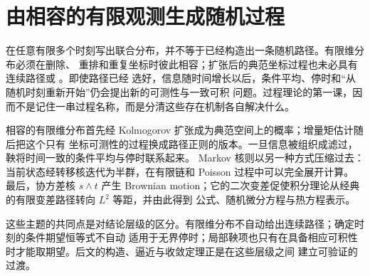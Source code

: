 \chapter{由相容的有限观测生成随机过程}\label{ch:06}

在任意有限多个时刻写出联合分布，并不等于已经构造出一条随机路径。有限维分布必须在删除、
重排和重复坐标时彼此相容；扩张后的典范坐标过程也未必具有连续路径或 \cadlagPath{}。即使路径已经
选好，信息随时间增长以后，条件平均、停时和“从随机时刻重新开始”仍会提出新的可测性与一致可积
问题。过程理论的第一课，因而不是记住一串过程名称，而是分清这些存在机制各自解决什么。

相容的有限维分布首先经 Kolmogorov 扩张成为典范空间上的概率；增量矩估计随后把这个只有
坐标可测性的过程换成路径正则的版本。一旦信息被组织成滤过，鞅将时间一致的条件平均与停时联系起来。
Markov 核则以另一种方式压缩过去：当前状态经转移核迭代为半群，在有限链和 Poisson 过程中可以完全展开计算。
最后，协方差核 $s\wedge t$ 产生 Brownian motion；它的二次变差促使积分理论从经典的有限变差路径转向
$L^2$ 等距，并由此得到 \Ito{} 公式、随机微分方程与热方程表示。

这些主题的共同点是对结论层级的区分。有限维分布不自动给出连续路径；确定时刻的条件期望恒等式不自动
适用于无界停时；局部鞅项也只有在具备相应可积性时才能取期望。后文的构造、逼近与收敛定理正是在这些层级之间
建立可验证的过渡。





